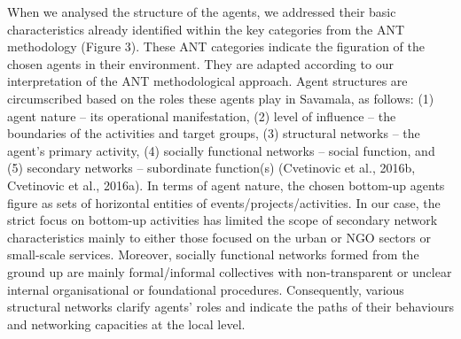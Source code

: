 \documentclass[11pt]{report}
\begin{document}
When we analysed the structure of the agents, we addressed their basic characteristics already identified within the key categories from the ANT methodology (Figure 3). These ANT categories indicate the figuration of the chosen agents in their environment. They are adapted according to our interpretation of the ANT methodological approach. Agent structures are circumscribed based on the roles these agents play in Savamala, as follows: (1) agent nature – its operational manifestation, (2) level of influence – the boundaries of the activities and target groups, (3) structural networks – the agent’s primary activity, (4) socially functional networks – social function, and (5) secondary networks – subordinate function(s) (Cvetinovic et al., 2016b, Cvetinovic et al., 2016a). In terms of agent nature, the chosen bottom-up agents figure as sets of horizontal entities of events/projects/activities. In our case, the strict focus on bottom-up activities has limited the scope of secondary network characteristics mainly to either those focused on the urban or NGO sectors or small-scale services. Moreover, socially functional networks formed from the ground up are mainly formal/informal collectives with non-transparent or unclear internal organisational or foundational procedures. Consequently, various structural networks clarify agents’ roles and indicate the paths of their behaviours and networking capacities at the local level.
\end{document}
